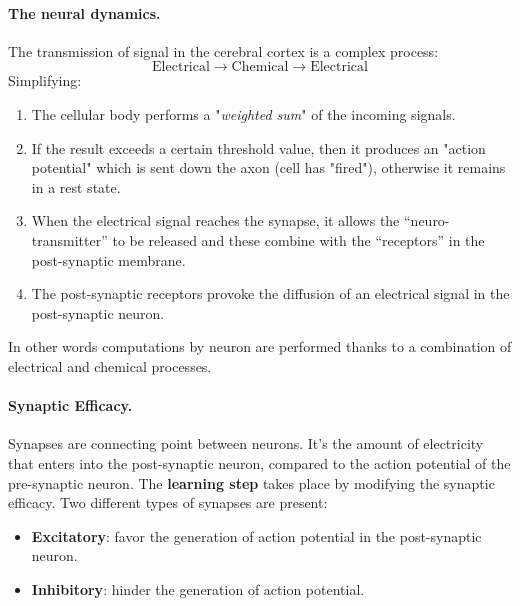 \paragraph*{The neural dynamics.} The transmission of signal in the cerebral cortex is a complex process:
$$\text{Electrical} \rightarrow \text{Chemical} \rightarrow \text{Electrical}$$
Simplifying:
\begin{enumerate}
	\item The cellular body performs a "\textit{weighted sum}" of the incoming signals.
	\item If the result exceeds a certain threshold value, then it produces an "action potential" which is sent down the axon (cell has "fired"), otherwise it remains in a rest state.
	\item When the electrical signal reaches the synapse, it allows the “neuro-transmitter” to be released and these combine with the “receptors” in the post-synaptic membrane.
	\item The post-synaptic receptors provoke the diffusion of an electrical signal in the post-synaptic neuron. 
\end{enumerate}
In other words computations by neuron are performed thanks to a combination of electrical and chemical processes. 

\paragraph*{Synaptic Efficacy.} Synapses are connecting point between neurons. It’s the amount of electricity that enters into the post-synaptic neuron, compared to the action potential of the pre-synaptic neuron. The \textbf{learning step} takes place by modifying the synaptic efficacy. Two different types of synapses are present:
\begin{itemize}
	\item \textbf{Excitatory}: favor the generation of action potential in the post-synaptic neuron.
	\item \textbf{Inhibitory}: hinder the generation of action potential.
\end{itemize}

